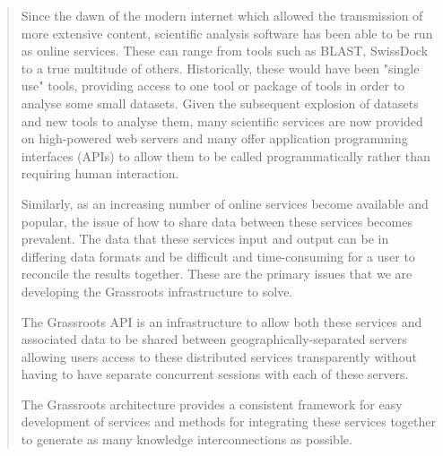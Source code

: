 \documentclass[12pt,a4paper]{extarticle}
\begin{document}
\begin{abstract}

Since the dawn of the modern internet which allowed the transmission of more extensive content, scientific analysis software has been able to be run as online services.
These can range from tools such as BLAST\cite{Camacho:2008}, SwissDock\cite{Grosdidier2011SwissDock} to a true multitude of others.
Historically, these would have been "single use" tools, providing access to one tool or package of tools in order to analyse some small datasets.
Given the subsequent explosion of datasets and new tools to analyse them, many scientific services are now provided on high-powered web servers and many offer application programming interfaces (APIs) to allow them to be called programmatically rather than requiring human interaction.

Similarly, as an increasing number of online services become available and popular, the issue of how to share data between these services becomes prevalent.
The data that these services input and output can be in differing data formats and be difficult and time-consuming for a user to reconcile the results together.
These are the primary issues that we are developing the Grassroots infrastructure to solve.


The Grassroots API is an infrastructure to allow both these services and associated data to be shared between geographically-separated servers allowing users access to these distributed services transparently without having to have separate concurrent sessions with each of these servers.

The Grassroots architecture provides a consistent framework for easy development of services and methods for integrating these services together to generate as many knowledge interconnections as possible.


\end{abstract}
\end{document}
